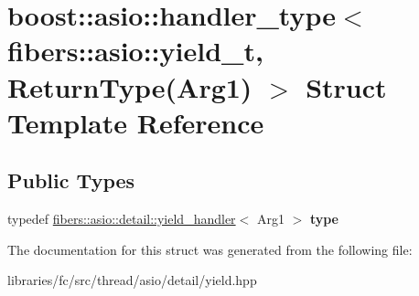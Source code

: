 \hypertarget{structboost_1_1asio_1_1handler__type_3_01fibers_1_1asio_1_1yield__t_00_01_return_type_07_arg1_08_01_4}{}\section{boost\+:\+:asio\+:\+:handler\+\_\+type$<$ fibers\+:\+:asio\+:\+:yield\+\_\+t, Return\+Type(Arg1) $>$ Struct Template Reference}
\label{structboost_1_1asio_1_1handler__type_3_01fibers_1_1asio_1_1yield__t_00_01_return_type_07_arg1_08_01_4}
\subsection*{Public Types}
\begin{DoxyCompactItemize}
\item 
\mbox{\label{structboost_1_1asio_1_1handler__type_3_01fibers_1_1asio_1_1yield__t_00_01_return_type_07_arg1_08_01_4_a0b74255947a8a4ca65ddd5915d5350a3}} 
typedef \mbox{\hyperlink{classboost_1_1fibers_1_1asio_1_1detail_1_1yield__handler}{fibers\+::asio\+::detail\+::yield\+\_\+handler}}$<$ Arg1 $>$ {\bfseries type}
\end{DoxyCompactItemize}


The documentation for this struct was generated from the following file\+:\begin{DoxyCompactItemize}
\item 
libraries/fc/src/thread/asio/detail/yield.\+hpp\end{DoxyCompactItemize}
